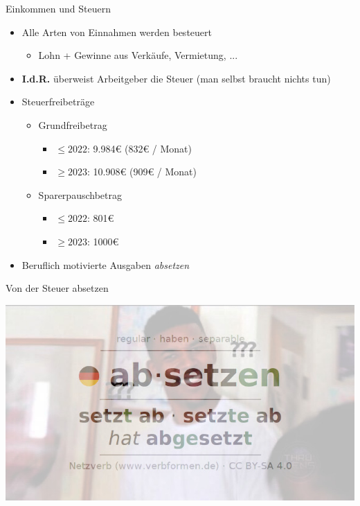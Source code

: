 \documentclass{beamer}
\begin{document}
			\begin{frame}{Einkommen und Steuern}
				\begin{itemize}
					\item Alle Arten von Einnahmen werden besteuert
					\begin{itemize}
						\item Lohn + Gewinne aus Verkäufe, Vermietung, ...
					\end{itemize}
					\item \textbf{I.d.R.} überweist Arbeitgeber die Steuer (man selbst braucht nichts tun)
					\item Steuerfreibeträge
					\begin{itemize}
						\item Grundfreibetrag
						\begin{itemize}
							\item $\leq2022$:  9.984€ (832€ / Monat)
							\item $\geq2023$: 10.908€ (909€ / Monat)
						\end{itemize}
						\item Sparerpauschbetrag
						\begin{itemize}
							\item $\leq2022$: 801€
							\item $\geq2023$: 1000€
						\end{itemize}
					\end{itemize}
					\item Beruflich motivierte Ausgaben \textit{absetzen}
				\end{itemize}
			\end{frame}
		
			\begin{frame}{Von der Steuer absetzen}
				\begin{center}
					\includegraphics[width=0.75\linewidth]{images/absetzen}
				\end{center}
			\end{frame}
		
\end{document}
